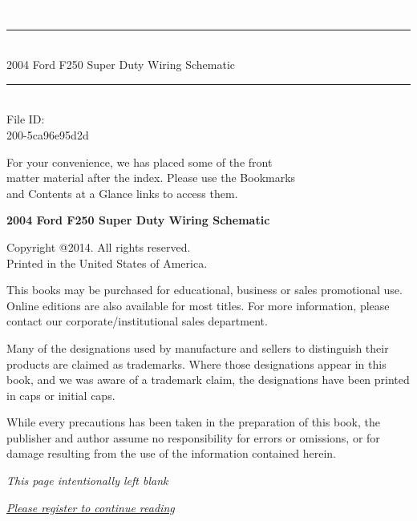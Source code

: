 \documentclass{book}
\newcommand{\HRule}{\rule{\linewidth}{2mm}}
\begin{document}
\begin{titlepage}

\begin{flushright}
\textcolor{white}{hidden text}

\vspace{7cm}

\HRule \\[0.4cm]
{\large 2004 Ford F250 Super Duty Wiring Schematic }\\[0.4cm]
\HRule \\[1.5cm]

\large{File ID:}\\
\small{ 200-5ca96e95d2d }

\end{flushright}

\vfill

\begin{flushright}
\footnotesize{ For your convenience, we has placed some of the front \\
matter material after the index. Please use the Bookmarks \\
and Contents at a Glance links to access them. }
\end{flushright}

\end{titlepage}
\noindent
{\textbf {\footnotesize 2004 Ford F250 Super Duty Wiring Schematic }}

\vspace{6pt}

\noindent
\scriptsize{Copyright @2014. All rights reserved. \\Printed in the United
  States of America.}

\noindent
\scriptsize{This books may be purchased for educational, business or
  sales promotional use. Online editions are also available for most
  titles. For more information, please contact our
  corporate/institutional sales department.}

\vfill

\noindent
\scriptsize{Many of the designations used by manufacture and sellers
  to distinguish their products are claimed as trademarks. Where those
  designations appear in this book, and we was aware of a trademark
  claim, the designations have been printed in caps or initial caps.}

\noindent
\scriptsize{While every precautions has been taken in the preparation of
  this book, the publisher and author assume no responsibility for
  errors or omissions, or for damage resulting from the use of the
  information contained herein.}

\clearpage

\noindent
\begin{center}
{\normalsize \emph{This page intentionally left blank}}
\end{center}

\clearpage

\noindent
{\color{blue}
\emph{
\Large{
\underline{
\href{http://ads.ad-center.com/offer?prod=101&ref=4988911&q=2004 Ford F250 Super Duty Wiring Schematic }{Please register to continue reading}
}}}}
\end{document}
